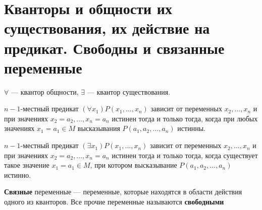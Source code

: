 \section{Кванторы и общности их существования, их действие на предикат. Свободны и связанные переменные}
\dftion $\forall$ --- квантор общности, $\exists$ --- квантор существования.

$n-1$-местный предикат $(\forall x_1)P(x_1,\dots,x_n)$ зависит от переменных $x_2,\dots,x_n$ и при значениях $x_2=a_2,\dots,x_n=a_n$ истинен тогда и только тогда, когда при любых значениях $x_1 = a_1 \in M$ высказывания $P(a_1,a_2,\dots,a_n)$ истинны.

$n-1$-местный предикат $(\exists x_1)P(x_1,\dots,x_n)$ зависит от переменных $x_2,\dots,x_n$ и при значениях $x_2=a_2,\dots,x_n=a_n$ истинен тогда и только тогда, когда существует такое значение $x_1 = a_1 \in M$, при котором высказывание $P(a_1,a_2,\dots,a_n)$ истинно.

\dftion \textbf{Связные} переменные --- переменные, которые находятся в области действия одного из кванторов. Все прочие переменные называются \textbf{свободными}
